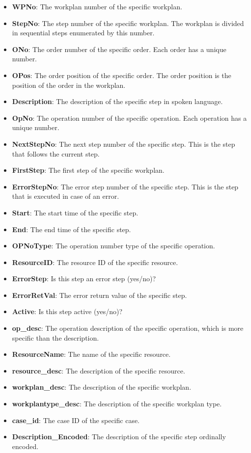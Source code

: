 \begin{itemize}
    \item \textbf{WPNo}: The workplan number of the specific workplan.
    \item \textbf{StepNo}: The step number of the specific workplan. The workplan is divided in sequential steps enumerated by this number.
    \item \textbf{ONo}: The order number of the specific order. Each order has a unique number.
    \item \textbf{OPos}: The order position of the specific order. The order position is the position of the order in the workplan.
    \item \textbf{Description}: The description of the specific step in spoken language.
    \item \textbf{OpNo}: The operation number of the specific operation. Each operation has a unique number.
    \item \textbf{NextStepNo}: The next step number of the specific step. This is the step that follows the current step.
    \item \textbf{FirstStep}: The first step of the specific workplan.
    \item \textbf{ErrorStepNo}: The error step number of the specific step. This is the step that is executed in case of an error.
    \item \textbf{Start}: The start time of the specific step.
    \item \textbf{End}: The end time of the specific step.
    \item \textbf{OPNoType}: The operation number type of the specific operation.
    \item \textbf{ResourceID}: The resource ID of the specific resource.
    \item \textbf{ErrorStep}: Is this step an error step (yes/no)?
    \item \textbf{ErrorRetVal}: The error return value of the specific step.
    \item \textbf{Active}: Is this step active (yes/no)?
    \item \textbf{op\_desc}: The operation description of the specific operation, which is more specific than the description.
    \item \textbf{ResourceName}: The name of the specific resource.
    \item \textbf{resource\_desc}: The description of the specific resource.
    \item \textbf{workplan\_desc}: The description of the specific workplan.
    \item \textbf{workplantype\_desc}: The description of the specific workplan type.
    \item \textbf{case\_id}: The case ID of the specific case.
    \item \textbf{Description\_Encoded}: The description of the specific step ordinally encoded.
\end{itemize}

